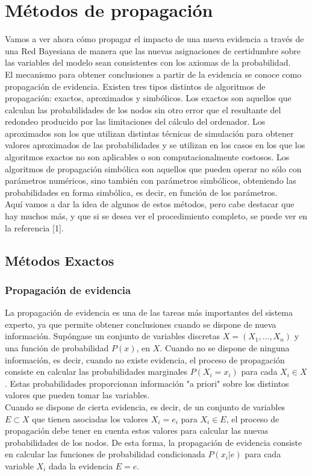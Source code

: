 \documentclass{article}
\theoremstyle{definition_wo_parentheses}
\begin{document}
\section{Métodos de propagación}
Vamos a ver ahora cómo propagar el impacto de una nueva evidencia a través de una Red Bayesiana de manera que las nuevas asignaciones de certidumbre sobre las variables del modelo sean consistentes con los axiomas de la probabilidad.\\
El mecanismo para obtener conclusiones a partir de la evidencia se conoce como propagación de evidencia. Existen tres tipos distintos de algoritmos de propagación: exactos, aproximados y simbólicos. Los exactos son aquellos que calculan las probabilidades de los nodos sin otro error que el resultante del redondeo producido por las limitaciones del cálculo del ordenador. Los aproximados son los que utilizan distintas técnicas de simulación para obtener valores aproximados de las probabilidades y se utilizan en los casos en los que los algoritmos exactos no son aplicables o son computacionalmente costosos. Los algoritmos de propagación simbólica son aquellos que pueden operar no sólo con parámetros numéricos, sino también con parámetros simbólicos, obteniendo las probabilidades en forma simbólica, es decir, en función de los parámetros.\\

Aquí vamos a dar la idea de algunos de estos métodos, pero cabe destacar que hay muchos más, y que si se desea ver el procedimiento completo, se puede ver en la referencia [1].

\subsection{Métodos Exactos}

\subsubsection{Propagación de evidencia}
La propagación de evidencia es una de las tareas más importantes del sistema experto, ya que permite obtener conclusiones cuando se dispone de nueva información. Supóngase un conjunto de variables discretas $X=(X_1,...,X_n)$ y una función de probabilidad $P(x)$, en $X$. Cuando no se dispone de ninguna información, es decir, cuando no existe evidencia, el proceso de propagación consiste en calcular las probabilidades marginales $P(X_i=x_i)$ para cada $X_i \in X$. Estas probabilidades proporcionan información "a priori" sobre los distintos valores que pueden tomar las variables.\\
Cuando se dispone de cierta evidencia, es decir, de un conjunto de variables $E \subset X$ que tienen asociadas los valores $X_i = e_i$ para $X_i \in E$, el proceso de propagación debe tener en cuenta estos valores para calcular las nuevas probabilidades de los nodos. De esta forma, la propagación de evidencia consiste en calcular las funciones de probabilidad condicionada $P(x_i|e)$ para cada variable $X_i$ dada la evidencia $E=e$.\\
\end{document}
